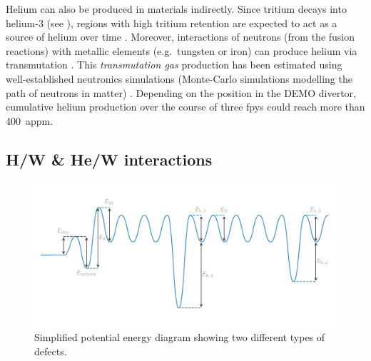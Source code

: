 Helium can also be produced in materials indirectly.
Since tritium decays into helium-3 (see ), regions with high tritium \gls{retention} are expected to act as a source of helium over time \cite{shimada_tritium_2017}.
Moreover, interactions of neutrons (from the fusion reactions) with metallic elements (e.g.\ tungsten or iron) can produce helium via transmutation .
This \emph{\gls{transmutation gas}} production has been estimated using well-established neutronics simulations (Monte-Carlo simulations modelling the path of neutrons in matter) .
Depending on the position in the DEMO \gls{divertor}, cumulative helium production over the course of three \glspl{fpy} could reach more than \SI{400}{appm}.


\subsection{H/W \& He/W interactions}


\begin{figure} [h]
    \centering
    \includegraphics[width=\linewidth]{Figures/Chapter1/potential_energy_diagram.pdf}
    \caption{Simplified potential energy diagram showing two different types of defects.}
\end{figure}

